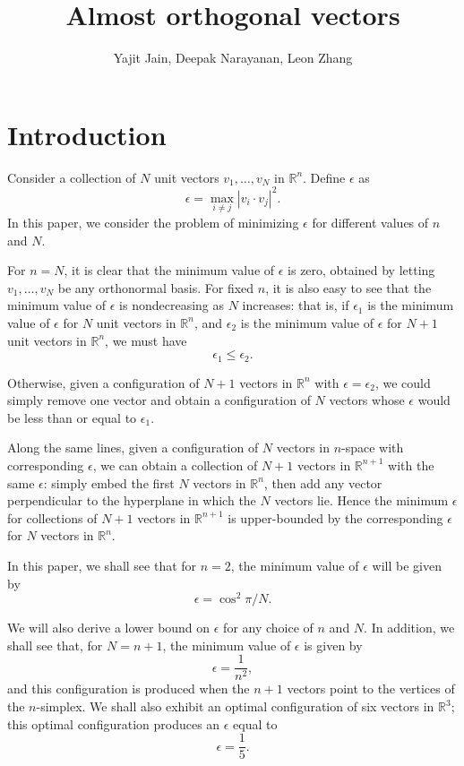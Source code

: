 \documentclass[11pt,letterpaper,twoside,english]{article}
\title{Almost orthogonal vectors}
\author{Yajit Jain, Deepak Narayanan, Leon Zhang}
\theoremstyle{theorem}
\theoremstyle{remark}
\begin{document}
\maketitle

\section{Introduction}
Consider a collection of $N$ unit vectors $v_1, \ldots, v_N$ in $\mathbb R^n$. Define $\epsilon$ as
\[\epsilon=\max_{i\neq j}|v_i\cdot v_j|^2.\]
In this paper, we consider the problem of minimizing $\epsilon$ for different values of $n$ and $N$.

For $n=N$, it is clear that the minimum value of $\epsilon$ is zero, obtained by letting $v_1,\ldots, v_N$ be any orthonormal basis. For fixed $n$, it is also easy to see that the minimum value of $\epsilon$ is nondecreasing as $N$ increases: that is, if $\epsilon_1$ is the minimum value of $\epsilon$ for $N$ unit vectors in $\mathbb R^n$, and $\epsilon_2$ is the minimum value of $\epsilon$ for $N+1$ unit vectors in $\mathbb R^n$, we must have 
\[\epsilon_1\leq \epsilon_2.\] 

Otherwise, given a configuration of $N+1$ vectors in $\mathbb R^n$ with $\epsilon=\epsilon_2$, we could simply remove one vector and obtain a configuration of $N$ vectors whose $\epsilon$ would be less than or equal to $\epsilon_1$.

Along the same lines, given a configuration of $N$ vectors in $n$-space with corresponding $\epsilon$, we can obtain a collection of $N+1$ vectors in $\mathbb R^{n+1}$ with the same $\epsilon$: simply embed the first $N$ vectors in $\mathbb R^{n}$, then add any vector perpendicular to the hyperplane in which the $N$ vectors lie. Hence the minimum $\epsilon$ for collections of $N+1$ vectors in $\mathbb R^{n+1}$ is upper-bounded by the corresponding $\epsilon$ for $N$ vectors in $\mathbb R^n$.

In this paper, we shall see that for $n=2$, the minimum value of $\epsilon$ will be given by 
\[\epsilon=\cos^2\pi/N.\] 

We will also derive a lower bound on $\epsilon$ for any choice of $n$ and $N$. In addition, we shall see that, for $N=n+1$, the minimum value of $\epsilon$ is given by
\[\epsilon=\frac{1}{n^2},\] 
and this configuration is produced when the $n+1$ vectors point to the vertices of the $n$-simplex. We shall also exhibit an optimal configuration of six vectors in $\mathbb R^3$; this optimal configuration produces an $\epsilon$ equal to
\[\epsilon=\frac 1 5.\]
\end{document}
